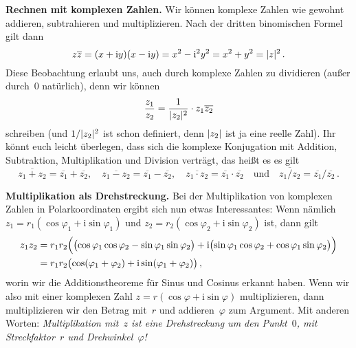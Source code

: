 \textbf{Rechnen mit komplexen Zahlen.} Wir können komplexe Zahlen wie gewohnt addieren, subtrahieren und multiplizieren. Nach der dritten binomischen Formel gilt dann 
\begin{equation*}
	z\overline{z}=(x+\mathrm{i} y)(x-\mathrm{i} y)=x^2-\mathrm{i}^2y^2=x^2+y^2=\abs{z}^2\,.
\end{equation*}
Diese Beobachtung erlaubt uns, auch durch komplexe Zahlen zu dividieren (außer durch~$0$ natürlich), denn wir können 
\begin{equation*}
	\frac{z_1}{z_2}=\frac{1}{\abs{z_2}^2}\cdot z_1\overline{z_2}
\end{equation*}
schreiben (und $1/\abs{z_2}^2$ ist schon definiert, denn $\abs{z_2}$ ist ja eine reelle Zahl). Ihr könnt euch leicht überlegen, dass sich die komplexe Konjugation mit Addition, Subtraktion, Multiplikation und Division verträgt,
das heißt es es gilt
\begin{equation*}
	\overline{z_1+z_2}=\overline{z_1}+\overline{z_2},\quad
	\overline{z_1-z_2}=\overline{z_1}-\overline{z_2},\quad
	\overline{z_1\cdot z_2}=\overline{z_1}\cdot \overline{z_2}\quad
	\text{und}\quad
	\overline{z_1/z_2}=\overline{z_1}/\overline{z_2}\,.
\end{equation*}

\textbf{Multiplikation als Drehstreckung.}
Bei der Multiplikation von komplexen Zahlen in Polarkoordinaten ergibt sich nun etwas Interessantes: Wenn nämlich $z_1=r_1(\cos\varphi_1+\mathrm{i}\sin\varphi_1)$ und $z_2=r_2(\cos\varphi_2+\mathrm{i}\sin\varphi_2)$ ist, dann gilt
\begin{align*}
	z_1z_2&=r_1r_2\parens[\Big]{\parens[\big]{\cos\varphi_1\cos\varphi_2-\sin\varphi_1\sin\varphi_2}+\mathrm{i}\parens[\big]{\sin\varphi_1\cos\varphi_2+\cos\varphi_1\sin\varphi_2}}\\
	&=r_1r_2\parens[\big]{\cos(\varphi_1+\varphi_2)+\mathrm{i}\sin(\varphi_1+\varphi_2)}\,,
\end{align*}
worin wir die Additionstheoreme für Sinus und Cosinus erkannt haben. Wenn wir also mit einer komplexen Zahl $z=r(\cos\varphi+\mathrm{i}\sin\varphi)$ multiplizieren, dann multiplizieren wir den Betrag mit~$r$ und addieren~$\varphi$ zum Argument. Mit anderen Worten: \emph{Multiplikation mit~$z$ ist eine Drehstreckung um den Punkt~\(0\), mit Streckfaktor~$r$ und Drehwinkel~$\varphi$!}

